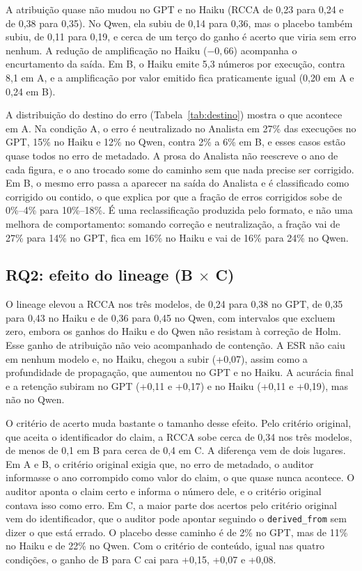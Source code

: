 A atribuição quase não mudou no GPT e no Haiku (RCCA de 0,23 para 0,24 e de 0,38 para 0,35).
No Qwen, ela subiu de 0,14 para 0,36, mas o placebo também subiu, de 0,11 para 0,19, e cerca de um terço do ganho é acerto que viria sem erro nenhum.
A redução de amplificação no Haiku ($-0{,}66$) acompanha o encurtamento da saída. Em B, o Haiku emite 5,3 números por execução, contra 8,1 em A, e a amplificação por valor emitido fica praticamente igual (0,20 em A e 0,24 em B).



A distribuição do destino do erro (Tabela~\ref{tab:destino}) mostra o que acontece em A.
Na condição A, o erro é neutralizado no Analista em 27\% das execuções no GPT, 15\% no Haiku e 12\% no Qwen, contra 2\% a 6\% em B, e esses casos estão quase todos no erro de metadado.
A prosa do Analista não reescreve o ano de cada figura, e o ano trocado some do caminho sem que nada precise ser corrigido.
Em B, o mesmo erro passa a aparecer na saída do Analista e é classificado como corrigido ou contido, o que explica por que a fração de erros corrigidos sobe de 0\%--4\% para 10\%--18\%. É uma reclassificação produzida pelo formato, e não uma melhora de comportamento: somando correção e neutralização, a fração vai de 27\% para 14\% no GPT, fica em 16\% no Haiku e vai de 16\% para 24\% no Qwen.

\subsection{RQ2: efeito do lineage (B $\times$ C)}\label{sec:rq2}

O lineage elevou a RCCA nos três modelos, de 0,24 para 0,38 no GPT, de 0,35 para 0,43 no Haiku e de 0,36 para 0,45 no Qwen, com intervalos que excluem zero, embora os ganhos do Haiku e do Qwen não resistam à correção de Holm.
Esse ganho de atribuição não veio acompanhado de contenção.
A ESR não caiu em nenhum modelo e, no Haiku, chegou a subir (+0,07), assim como a profundidade de propagação, que aumentou no GPT e no Haiku.
A acurácia final e a retenção subiram no GPT (+0,11 e +0,17) e no Haiku (+0,11 e +0,19), mas não no Qwen.

O critério de acerto muda bastante o tamanho desse efeito.
Pelo critério original, que aceita o identificador do claim, a RCCA sobe cerca de 0,34 nos três modelos, de menos de 0,1 em B para cerca de 0,4 em C.
A diferença vem de dois lugares.
Em A e B, o critério original exigia que, no erro de metadado, o auditor informasse o ano corrompido como valor do claim, o que quase nunca acontece. O auditor aponta o claim certo e informa o número dele, e o critério original contava isso como erro.
Em C, a maior parte dos acertos pelo critério original vem do identificador, que o auditor pode apontar seguindo o \texttt{derived\_from} sem dizer o que está errado. O placebo desse caminho é de 2\% no GPT, mas de 11\% no Haiku e de 22\% no Qwen.
Com o critério de conteúdo, igual nas quatro condições, o ganho de B para C cai para +0,15, +0,07 e +0,08.

